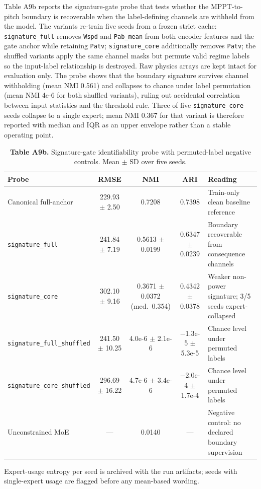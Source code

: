 \documentclass[
  journal]{IEEEtran}
\begin{document}
Table A9b reports the signature-gate probe that tests whether the
MPPT-to-pitch boundary is recoverable when the label-defining channels
are withheld from the model. The variants re-train five seeds from a
frozen strict cache: \texttt{signature\_full} removes \texttt{Wspd} and
\texttt{Pab\_mean} from both encoder features and the gate anchor while
retaining \texttt{Patv}; \texttt{signature\_core} additionally removes
\texttt{Patv}; the shuffled variants apply the same channel masks but
permute valid regime labels so the input-label relationship is
destroyed. Raw physics arrays are kept intact for evaluation only. The
probe shows that the boundary signature survives channel withholding
(mean NMI 0.561) and collapses to chance under label permutation (mean
NMI 4e-6 for both shuffled variants), ruling out accidental correlation
between input statistics and the threshold rule. Three of five
\texttt{signature\_core} seeds collapse to a single expert; mean NMI
0.367 for that variant is therefore reported with median and IQR as an
upper envelope rather than a stable operating point.

\begin{table}[!t]
\centering
\fontsize{8.0pt}{9.2pt}\selectfont
\setlength{\tabcolsep}{3.5pt}
\renewcommand{\arraystretch}{1.03}
\caption*{\textbf{Table A9b.} Signature-gate identifiability probe with permuted-label negative controls. Mean $\pm$ SD over five seeds.}
%
\begin{tabularx}{\textwidth}{@{}l c c c >{\raggedright\arraybackslash}X@{}}
\toprule
Probe & RMSE & NMI & ARI & Reading \\
\midrule
Canonical full-anchor & 229.93 $\pm$ 2.50 & 0.7208 & 0.7398 & Train-only clean baseline reference \\
\texttt{signature\_full} & 241.84 $\pm$ 7.19 & 0.5613 $\pm$ 0.0199 & 0.6347 $\pm$ 0.0239 & Boundary recoverable from consequence channels \\
\texttt{signature\_core} & 302.10 $\pm$ 9.16 & 0.3671 $\pm$ 0.0372 (med.\ 0.354) & 0.4342 $\pm$ 0.0378 & Weaker non-power signature; 3/5 seeds expert-collapsed \\
\texttt{signature\_full\_shuffled} & 241.50 $\pm$ 10.25 & 4.0e-6 $\pm$ 2.1e-6 & $-$1.3e-5 $\pm$ 5.3e-5 & Chance level under permuted labels \\
\texttt{signature\_core\_shuffled} & 296.69 $\pm$ 16.22 & 4.7e-6 $\pm$ 3.4e-6 & $-$2.0e-4 $\pm$ 1.7e-4 & Chance level under permuted labels \\
Unconstrained MoE & --- & 0.0140 & --- & Negative control: no declared boundary supervision \\
\bottomrule
\end{tabularx}
\vspace{1mm}
\raggedright\fontsize{8.0pt}{9.0pt}\selectfont Expert-usage entropy per seed is archived with the run artifacts; seeds with single-expert usage are flagged before any mean-based wording.
\end{table}
\end{document}

